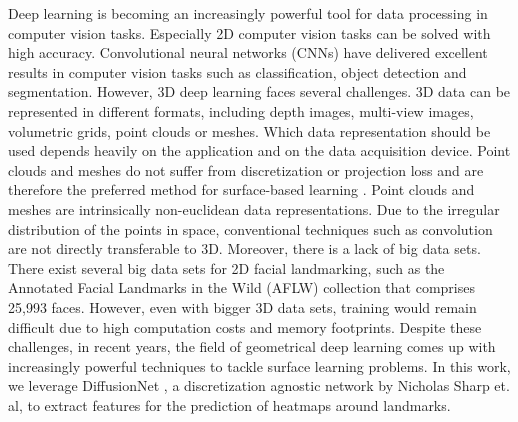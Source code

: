 Deep learning is becoming an increasingly powerful tool for data processing in computer vision tasks. Especially 2D computer vision tasks can be solved with high accuracy. Convolutional neural networks (CNNs) have delivered excellent results in computer vision tasks such as classification, object detection and segmentation. However, 3D deep learning faces several challenges. 3D data can be represented in different formats, including depth images, multi-view images, volumetric grids, point clouds or meshes. Which data representation should be used depends heavily on the application and on the data acquisition device. Point clouds and meshes do not suffer from discretization or projection loss and are therefore the preferred method for surface-based learning \cite{Guo2021}. Point clouds and meshes are intrinsically non-euclidean data representations. Due to the irregular distribution of the points in space, conventional techniques such as convolution are not directly transferable to 3D. Moreover, there is a lack of big data sets. There exist several big data sets for 2D facial landmarking, such as the Annotated Facial Landmarks in the Wild (AFLW) \cite{aflw} collection that comprises 25,993 faces. However, even with bigger 3D data sets, training would remain difficult due to high computation costs and memory footprints.%
Despite these challenges, in recent years, the field of geometrical deep learning comes up with increasingly powerful techniques to tackle surface learning problems. In this work, we leverage DiffusionNet \cite{sharp2022diffusionnet}, a discretization agnostic network by Nicholas Sharp et. al, to extract features for the prediction of heatmaps around landmarks.







